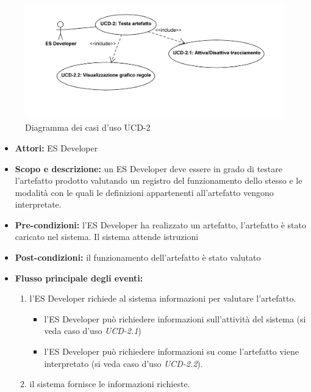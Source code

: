 
\begin{figure}
\centering
\includegraphics[width=1.1\textwidth]{Immagini/Capitolo2/UseCases/UCD-2.png}
\caption{Diagramma dei casi d'uso UCD-2}\label{fig:uc-ucd-2}
\end{figure}


\begin{itemize}
	\item \textbf{Attori:} ES Developer
	\item \textbf{Scopo e descrizione:} un ES Developer deve essere in grado di testare l'artefatto prodotto valutando un registro del funzionamento dello stesso e le modalità con le quali le definizioni appartenenti all'artefatto vengono interpretate.
	\item \textbf{Pre-condizioni:} l'ES Developer ha realizzato un artefatto, l'artefatto è stato caricato nel sistema. Il sistema attende istruzioni
	\item \textbf{Post-condizioni:} il funzionamento dell'artefatto è stato valutato
	\item \textbf{Flusso principale degli eventi:}
		\begin{enumerate}
			\item l'ES Developer richiede al sistema informazioni per valutare l'artefatto.
			\begin{itemize}
				\item l'ES Developer può richiedere informazioni sull'attività del sistema (si veda caso d'uso \emph{UCD-2.1})
				\item l'ES Developer può richiedere informazioni su come l'artefatto viene interpretato (si veda caso d'uso \emph{UCD-2.2}).
			\end{itemize}
			\item il sistema fornisce le informazioni richieste.
		\end{enumerate}
\end{itemize}


